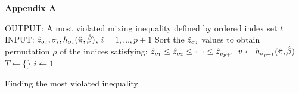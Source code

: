 \documentclass[11pt]{article}
\newcommand{\ti}{t} %
\newcommand{\cred}{\color{black}}
\begin{document}
\vspace{3 cm}
{\Large{
\noindent \textbf {Appendix A } \label{APP1}
}}

\vspace{0.6 cm}

\begin{algorithm}[H]
\label{alg:mostviolated}
\SetAlgoLined
{OUTPUT: A most violated mixing inequality defined by ordered index set $\ti$ } \;
INPUT: $\hat{z}_{\sigma_i}, \sigma_i, h_{\sigma_i}(\hat{\pi},\hat{\beta})$, $i=1,\ldots,p+1$ %
\;
Sort the $\hat{z}_{\sigma_i}$ values to obtain permutation $\rho$ of the indices satisfying:
$\hat{z}_{\rho_1} \leq \hat{z}_{\rho_2} \leq \cdots \leq \hat{z}_{\rho_{p+1}} $ \;
$v \gets h_{\sigma_{p+1}}(\hat{\pi},\hat{\beta})$\;
$T \gets \{ \}$\;
$ i \gets 1$\;
\caption{Finding the most violated inequality}
\end{algorithm}
\end{document}
